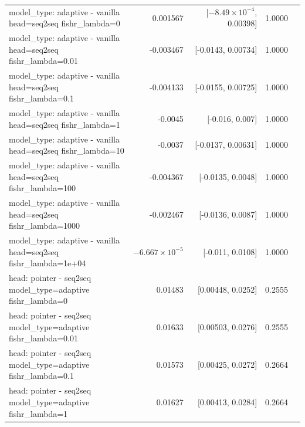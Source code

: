 \documentclass[10pt]{article}
\makeatletter
\newcommand{\stackcell}[1]{\begin{tabular}[t]{@{}l@{}}#1\end{tabular}}
\makeatother
\begin{document}
{\begin{longtable}{lrrrl}
\stackcell{model\_type: adaptive - vanilla\\\footnotesize head=seq2seq fishr\_lambda=0 } & 0.001567 & [$-8.49\times10^{-4}$, 0.00398] & 1.0000 & \\
\stackcell{model\_type: adaptive - vanilla\\\footnotesize head=seq2seq fishr\_lambda=0.01 } & -0.003467 & [-0.0143, 0.00734] & 1.0000 & \\
\stackcell{model\_type: adaptive - vanilla\\\footnotesize head=seq2seq fishr\_lambda=0.1 } & -0.004133 & [-0.0155, 0.00725] & 1.0000 & \\
\stackcell{model\_type: adaptive - vanilla\\\footnotesize head=seq2seq fishr\_lambda=1 } & -0.0045 & [-0.016, 0.007] & 1.0000 & \\
\stackcell{model\_type: adaptive - vanilla\\\footnotesize head=seq2seq fishr\_lambda=10 } & -0.0037 & [-0.0137, 0.00631] & 1.0000 & \\
\stackcell{model\_type: adaptive - vanilla\\\footnotesize head=seq2seq fishr\_lambda=100 } & -0.004367 & [-0.0135, 0.0048] & 1.0000 & \\
\stackcell{model\_type: adaptive - vanilla\\\footnotesize head=seq2seq fishr\_lambda=1000 } & -0.002467 & [-0.0136, 0.0087] & 1.0000 & \\
\stackcell{model\_type: adaptive - vanilla\\\footnotesize head=seq2seq fishr\_lambda=1e+04 } & $-6.667\times10^{-5}$ & [-0.011, 0.0108] & 1.0000 & \\
\stackcell{head: pointer - seq2seq\\\footnotesize model\_type=adaptive fishr\_lambda=0 } & 0.01483 & [0.00448, 0.0252] & 0.2555 & \\
\stackcell{head: pointer - seq2seq\\\footnotesize model\_type=adaptive fishr\_lambda=0.01 } & 0.01633 & [0.00503, 0.0276] & 0.2555 & \\
\stackcell{head: pointer - seq2seq\\\footnotesize model\_type=adaptive fishr\_lambda=0.1 } & 0.01573 & [0.00425, 0.0272] & 0.2664 & \\
\stackcell{head: pointer - seq2seq\\\footnotesize model\_type=adaptive fishr\_lambda=1 } & 0.01627 & [0.00413, 0.0284] & 0.2664 & \\

\end{longtable}}
\end{document}
